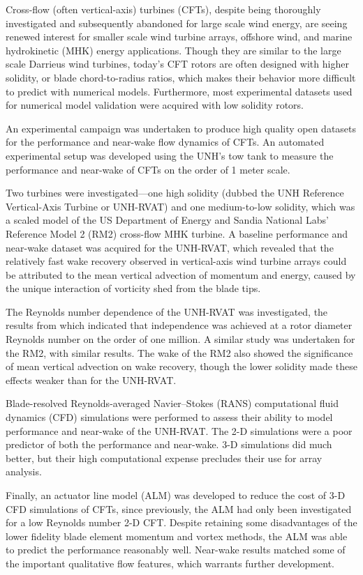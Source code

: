 \begin{Abstractpage}

\setlength{\baselineskip}{1.5\baselineskip}
{

Cross-flow (often vertical-axis) turbines (CFTs), despite being thoroughly
investigated and subsequently abandoned for large scale wind energy, are seeing
renewed interest for smaller scale wind turbine arrays, offshore wind, and
marine hydrokinetic (MHK) energy applications. Though they are similar to the
large scale Darrieus wind turbines, today's CFT rotors are often designed with
higher solidity, or blade chord-to-radius ratios, which makes their behavior
more difficult to predict with numerical models. Furthermore, most experimental
datasets used for numerical model validation were acquired with low solidity
rotors.

An experimental campaign was undertaken to produce high quality open datasets
for the performance and near-wake flow dynamics of CFTs. An automated
experimental setup was developed using the UNH's tow tank to measure the
performance and near-wake of CFTs on the order of 1 meter scale.

Two turbines were investigated---one high solidity (dubbed the UNH Reference
Vertical-Axis Turbine or UNH-RVAT) and one medium-to-low solidity, which was a
scaled model of the US Department of Energy and Sandia National Labs' Reference
Model 2 (RM2) cross-flow MHK turbine. A baseline performance and near-wake
dataset was acquired for the UNH-RVAT, which revealed that the relatively fast
wake recovery observed in vertical-axis wind turbine arrays could be attributed
to the mean vertical advection of momentum and energy, caused by the unique
interaction of vorticity shed from the blade tips.

The Reynolds number dependence of the UNH-RVAT was investigated, the results
from which indicated that independence was achieved at a rotor diameter Reynolds
number on the order of one million. A similar study was undertaken for the RM2,
with similar results. The wake of the RM2 also showed the significance of mean
vertical advection on wake recovery, though the lower solidity made these
effects weaker than for the UNH-RVAT.

Blade-resolved Reynolds-averaged Navier--Stokes (RANS) computational fluid
dynamics (CFD) simulations were performed to assess their ability to model
performance and near-wake of the UNH-RVAT. The 2-D simulations were a poor
predictor of both the performance and near-wake. 3-D simulations did much
better, but their high computational expense precludes their use for array
analysis.

Finally, an actuator line model (ALM) was developed to reduce the cost of 3-D
CFD simulations of CFTs, since previously, the ALM had only been investigated
for a low Reynolds number 2-D CFT. Despite retaining some disadvantages of the
lower fidelity blade element momentum and vortex methods, the ALM was able to
predict the performance reasonably well. Near-wake results matched some of the
important qualitative flow features, which warrants further development.


}


\end{Abstractpage}
